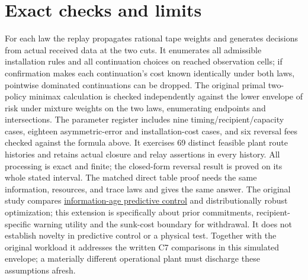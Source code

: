 \documentclass[11pt]{article}
\begin{document}
\section{Exact checks and limits}
For each law the replay propagates rational tape weights and generates
decisions from actual received data at the two cuts. It enumerates all
admissible installation rules and all continuation choices on reached
observation cells; if confirmation makes each continuation's cost
known identically under both laws, pointwise dominated continuations
can be dropped. The original primal two-policy minimax calculation is
checked independently against the lower envelope of risk under mixture
weights on the two laws, enumerating endpoints and intersections.
The parameter register includes nine timing/recipient/capacity cases,
eighteen asymmetric-error and installation-cost cases, and six reversal
fees checked against the formula above. It exercises 69 distinct
feasible plant route histories and retains actual closure and relay
assertions in every history. All processing is exact and finite;
the closed-form reversal result is proved on its whole stated interval.
The matched direct table proof needs the same information, resources,
and trace laws and gives the same answer. The original study compares
\href{https://arxiv.org/abs/2103.05526}{information-age predictive control}
and distributionally robust optimization; this extension is specifically
about prior commitments, recipient-specific warning utility and the
sunk-cost boundary for withdrawal. It does not establish novelty in
predictive control or a physical test. Together with the original
workload it addresses the written C7 comparisons in this simulated
envelope; a materially different operational plant must discharge these
assumptions afresh.
\end{document}
